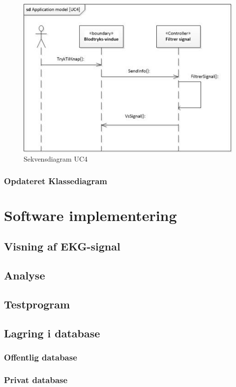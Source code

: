 \begin{figure}
	\includegraphics[width=1\textwidth]{Figurer/sdAppModelUC4}
	\caption{Sekvensdiagram UC4}
\end{figure}

\subsubsection{Opdateret Klassediagram}

\section{Software implementering}
 
\subsection{Visning af EKG-signal}

\subsection{Analyse}

\subsection{Testprogram}

\subsection{Lagring i database} 

\subsubsection{Offentlig database}

\subsubsection{Privat database}







